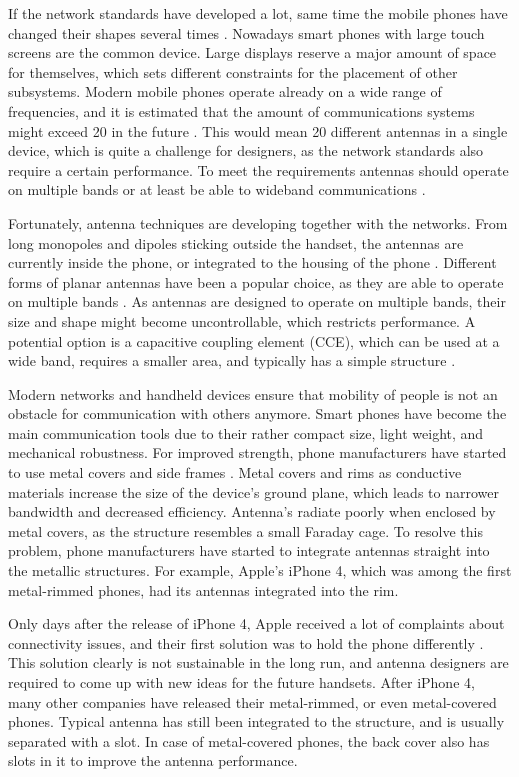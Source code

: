 If the network standards have developed a lot, same time the mobile phones have changed their shapes several times \cite{anguera2}. Nowadays smart phones with large touch screens are the common device. Large displays reserve a major amount of space for themselves, which sets different constraints for the placement of other subsystems. Modern mobile phones operate already on a wide range of frequencies, and it is estimated that the amount of communications systems might exceed 20 in the future \cite{20ant}. This would mean 20 different antennas in a single device, which is quite a challenge for designers, as the network standards also require a certain performance. To meet the requirements antennas should operate on multiple bands or at least be able to wideband communications \cite{lehtovuori_wideband_match}.

Fortunately, antenna techniques are developing together with the networks. From long monopoles and dipoles sticking outside the handset, the antennas are currently inside the phone, or integrated to the housing of the phone \cite{saunders,molisch}. Different forms of planar antennas have been a popular choice, as they are able to operate on multiple bands \cite{anguera}. As antennas are designed to operate on multiple bands, their size and shape might become uncontrollable, which restricts performance. A potential option is a capacitive coupling element (CCE), which can be used at a wide band, requires a smaller area, and typically has a simple structure \cite{valkonen_cce2}.

Modern networks and handheld devices ensure that mobility of people is not an obstacle for communication with others anymore. Smart phones have become the main communication tools due to their rather compact size, light weight, and mechanical robustness. For improved strength, phone manufacturers have started to use metal covers and side frames \cite{rowell}. Metal covers and rims as conductive materials increase the size of the device's ground plane, which leads to narrower bandwidth and decreased efficiency. Antenna's radiate poorly when enclosed by metal covers, as the structure resembles a small Faraday cage. To resolve this problem, phone manufacturers have started to integrate antennas straight into the metallic structures. For example, Apple's iPhone 4, which was among the first metal-rimmed phones, had its antennas integrated into the rim. 

Only days after the release of iPhone 4, Apple received a lot of complaints about connectivity issues, and their first solution was to hold the phone differently \cite{apple_press,apple_bbc}. This solution clearly is not sustainable in the long run, and antenna designers are required to come up with new ideas for the future handsets. After iPhone 4, many other companies have released their metal-rimmed, or even metal-covered phones. Typical antenna has still been integrated to the structure, and is usually separated with a slot. In case of metal-covered phones, the back cover also has slots in it to improve the antenna performance. 

